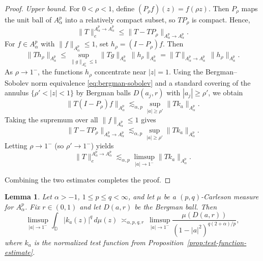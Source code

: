 \documentclass[preprint,12pt]{elsarticle}
\numberwithin{equation}{section}
\newtheorem{lemma}{Lemma}[section]
\theoremstyle{remark}
\begin{document}
\begin{proof}
\medskip
\noindent\textit{Upper bound.}
For $0<\rho<1$, define $(P_\rho f)(z)=f(\rho z)$. Then $P_\rho$ maps the unit ball of
$A_\alpha^p$ into a relatively compact subset, so $TP_\rho$ is compact. Hence,
\begin{equation*}
\|T\|_{e}^{A_\alpha^p\to A_\alpha^p}
\le
\|T-TP_\rho\|_{A_\alpha^p\to A_\alpha^p}.
\end{equation*}
For $f\in A_\alpha^p$ with $\|f\|_{A_\alpha^p}\le 1$, set $h_\rho=(I-P_\rho)f$. Then
\begin{equation*}
\|Th_\rho\|_{A_\alpha^p}
\le
\sup_{\|g\|_{A_\alpha^p}\le 1}\|Tg\|_{A_\alpha^p}\,\|h_\rho\|_{A_\alpha^p}
=
\|T\|_{A_\alpha^p\to A_\alpha^p}\,\|h_\rho\|_{A_\alpha^p}.
\end{equation*}
As $\rho\to 1^-$, the functions $h_\rho$ concentrate near $|z|=1$. Using the Bergman--Sobolev
norm equivalence \eqref{eq:bergman-sobolev} and a standard covering of the annulus
$\{\rho'<|z|<1\}$ by Bergman balls $D(a_j,r)$ with $|a_j|\ge\rho'$, we obtain
\begin{equation*}
\|T(I-P_\rho)f\|_{A_\alpha^p}
\lesssim_{\alpha,p}
\sup_{|a|\ge \rho'} \|Tk_a\|_{A_\alpha^p}.
\end{equation*}
Taking the supremum over all $\|f\|_{A_\alpha^p}\le 1$ gives
\begin{equation*}
\|T-TP_\rho\|_{A_\alpha^p\to A_\alpha^p}
\lesssim_{\alpha,p}
\sup_{|a|\ge \rho'} \|Tk_a\|_{A_\alpha^p}.
\end{equation*}
Letting $\rho\to 1^-$ (so $\rho'\to 1^-$) yields
\begin{equation*}
\|T\|_{e}^{A_\alpha^p\to A_\alpha^p}
\lesssim_{\alpha,p}
\limsup_{|a|\to 1^-}\|Tk_a\|_{A_\alpha^p}.
\end{equation*}

\medskip
Combining the two estimates completes the proof.
\end{proof}




\begin{lemma}\label{lem:pq-density-kernel}
Let $\alpha>-1$, $1\le p\le q<\infty$, and let $\mu$ be a $(p,q)$-Carleson measure for $A_\alpha^p$.
Fix $r\in(0,1)$ and let $D(a,r)$ be the Bergman ball. Then
\begin{equation}\label{eq:pq-density-kernel}
\limsup_{|a|\to 1^-}\int_{\mathbb D}|k_a(z)|^q\,d\mu(z)
\ \asymp_{\alpha,p,q,r}\
\limsup_{|a|\to 1^-}\frac{\mu(D(a,r))}{(1-|a|^2)^{q(2+\alpha)/p}},
\end{equation}
where $k_a$ is the normalized test function from Proposition~\ref{prop:test-function-estimate}.
\end{lemma}
\end{document}
